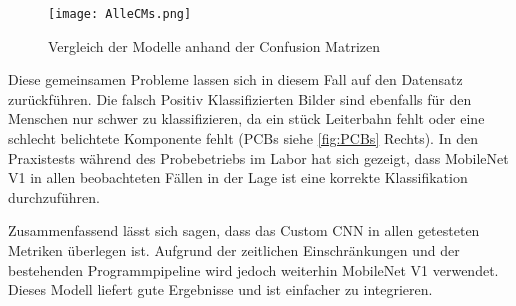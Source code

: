 \begin{figure}[h]
    \centering
    \texttt{[image: AlleCMs.png]}
    \caption{Vergleich der Modelle anhand der Confusion Matrizen}
    \label{fig:alle_cms}
\end{figure}

Diese gemeinsamen Probleme lassen sich in diesem Fall auf den Datensatz zurückführen. Die falsch Positiv Klassifizierten Bilder sind ebenfalls für den Menschen nur schwer zu klassifizieren, da ein stück Leiterbahn fehlt oder eine schlecht belichtete Komponente fehlt (\ac{PCB}s siehe \autoref{fig:PCBs} Rechts). In den Praxistests während des Probebetriebs im Labor hat sich gezeigt, dass MobileNet V1 in allen beobachteten Fällen in der Lage ist eine korrekte Klassifikation durchzuführen.

Zusammenfassend lässt sich sagen, dass das Custom CNN in allen getesteten Metriken überlegen ist. Aufgrund der zeitlichen Einschränkungen und der bestehenden Programmpipeline wird jedoch weiterhin MobileNet V1 verwendet. Dieses Modell liefert gute Ergebnisse und ist einfacher zu integrieren.

